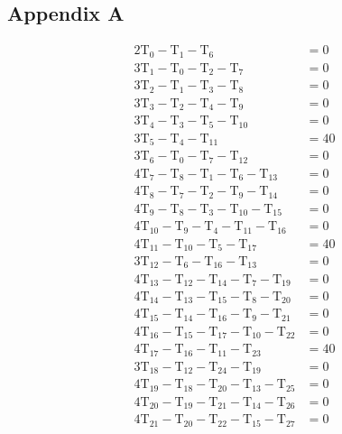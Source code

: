 \documentclass[12pt,a4paper]{article}
\begin{document}
\subsection*{Appendix A}
\begin{align*}
2\text{T}_0-\text{T}_1-\text{T}_6              & =0\\
3\text{T}_1-\text{T}_0-\text{T}_2-\text{T}_7          & =0\\
3\text{T}_2-\text{T}_1-\text{T}_3-\text{T}_8          & =0\\
3\text{T}_3-\text{T}_2-\text{T}_4-\text{T}_9          & =0\\
3\text{T}_4-\text{T}_3-\text{T}_5-\text{T}_{10}       & =0\\
3\text{T}_5-\text{T}_4-\text{T}_{11}           & =40\\
3\text{T}_6-\text{T}_0-\text{T}_7-\text{T}_{12}       & =0\\
4\text{T}_7-\text{T}_8-\text{T}_1-\text{T}_6-\text{T}_{13}   & =0\\
4\text{T}_8-\text{T}_7-\text{T}_2-\text{T}_9-\text{T}_{14}   & =0\\
4\text{T}_9-\text{T}_8-\text{T}_3-\text{T}_{10}-\text{T}_{15}& =0\\
4\text{T}_{10}-\text{T}_9-\text{T}_4-\text{T}_{11}-\text{T}_{16} & =0\\
4\text{T}_{11}-\text{T}_{10}-\text{T}_5-\text{T}_{17} & =40\\
3\text{T}_{12}-\text{T}_6-\text{T}_{16}-\text{T}_{13} & =0\\
4\text{T}_{13}-\text{T}_{12}-\text{T}_{14}-\text{T}_{7}-\text{T}_{19} & =0\\
4\text{T}_{14}-\text{T}_{13}-\text{T}_{15}-\text{T}_{8}-\text{T}_{20} & =0\\
4\text{T}_{15}-\text{T}_{14}-\text{T}_{16}-\text{T}_{9}-\text{T}_{21} & =0\\
4\text{T}_{16}-\text{T}_{15}-\text{T}_{17}-\text{T}_{10}-\text{T}_{22}& =0\\
4\text{T}_{17}-\text{T}_{16}-\text{T}_{11}-\text{T}_{23} & =40\\
3\text{T}_{18}-\text{T}_{12}-\text{T}_{24}-\text{T}_{19} & =0\\
4\text{T}_{19}-\text{T}_{18}-\text{T}_{20}-\text{T}_{13}-\text{T}_{25} & =0\\
4\text{T}_{20}-\text{T}_{19}-\text{T}_{21}-\text{T}_{14}-\text{T}_{26} & =0\\
4\text{T}_{21}-\text{T}_{20}-\text{T}_{22}-\text{T}_{15}-\text{T}_{27} & =0\\

\end{align*}
\end{document}
